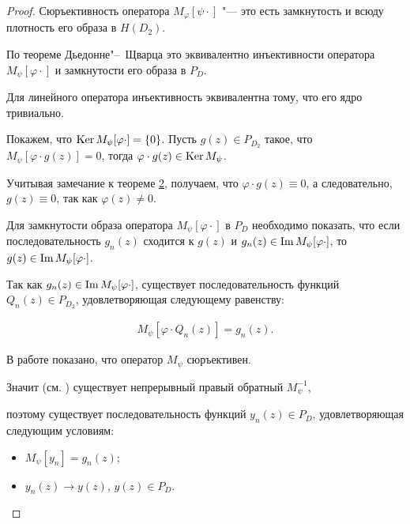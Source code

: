 \begin{proof}

Сюръективность оператора $M_\varphi[\psi\cdot]$ "--- это есть  замкнутость и всюду плотность его образа в $H(D_2)$. 

По теореме Дьедонне"--~Щварца \cite{zabirova3} это эквивалентно инъективности оператора $M_\psi[\varphi\cdot]$ и замкнутости его образа в $P_D$.



Для линейного оператора инъективность эквивалентна тому, что его ядро тривиально. 

Покажем, что $\mathop{\rm Ker} M_\psi[\varphi\cdot]=\{0\}$. Пусть $g(z)\in P_{D_2}$ такое, что $M_\psi[\varphi\cdot g(z)]=0$, тогда $\varphi\cdot g(z)\in \mathop{\rm Ker} M_\psi$. 

Учитывая замечание к теореме \hyperlink{nap:z:t2}{2}, получаем, что $\varphi \cdot g(z)\equiv 0$,  а следовательно, $g(z)\equiv 0$, так как $\varphi(z)\neq 0$.



Для замкнутости образа оператора $M_\psi[\varphi \cdot]$ в $P_D$ необходимо показать, что если последовательность $g_n(z)$ сходится к $g(z)$ и $g_n(z)\in \mathop{\rm Im} M_\psi[\varphi\cdot]$, то $g(z)\in \mathop{\rm Im} M_\psi[\varphi\cdot]$. 

Так как $g_n(z)\in \mathop{\rm Im} M_\psi[\varphi \cdot]$, существует последовательность функций $Q_n(z)\in P_{D_2}$, удовлетворяющая следующему равенству: 

\begin{eqnarray} \label{nap:z:eq2.2}

M_\psi[\varphi\cdot Q_n(z)]=g_n(z). 

\end{eqnarray}

В работе \cite{zabirova4} показано, что оператор $M_\psi$  сюръективен. 

Значит (см. \cite{zabirova6}) существует непрерывный правый обратный $M_\psi^{-1}$, 

поэтому существует последовательность функций $y_n(z)\in P_D$, удовлетворяющая следующим условиям: 

\begin{itemize}

\item[1)] $M_\psi[y_n]=g_n(z)$; 

\item[2)] $y_n(z)\rightarrow y(z)$, $y(z)\in P_D$. 

\end{itemize}




\end{proof}
